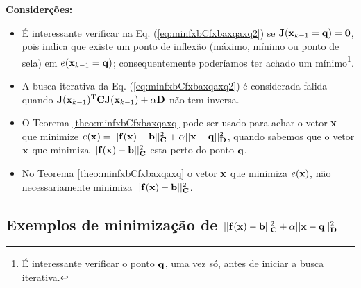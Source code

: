 \begin{theorem}
\textbf{Considerções:}

\begin{itemize}
\item É interessante verificar na Eq. (\ref{eq:minfxbCfxbaxqaxq2}) 
se  $\MATRIX{J}(\VECTOR{x}_{k-1}=\VECTOR{q}) = \MATRIX{0}$,
pois indica que existe um ponto de inflexão 
(máximo, mínimo ou ponto de sela) em $e(\VECTOR{x}_{k-1}=\VECTOR{q})$;
consequentemente poderíamos ter achado um mínimo\footnote{\label{foot:labq}É 
interessante verificar o ponto $\VECTOR{q}$, uma vez só, 
antes de iniciar a busca iterativa.}.
\item A busca iterativa da Eq. (\ref{eq:minfxbCfxbaxqaxq2}) é considerada falida quando 
$\MATRIX{J}(\VECTOR{x}_{k-1})^{\transpose}\MATRIX{C} \MATRIX{J}(\VECTOR{x}_{k-1}) +\alpha\MATRIX{D}$
não tem inversa.
\end{itemize}

\end{theorem} 

\begin{tcbattention}
\begin{itemize}
\item O Teorema \ref{theo:minfxbCfxbaxqaxq} pode ser usado para achar o vetor $\VECTOR{x}$
que minimize $e(\VECTOR{x})=||\VECTOR{f}(\VECTOR{x})-\VECTOR{b}||_{\MATRIX{C}}^2+\alpha||\VECTOR{x}-\VECTOR{q}||_{\MATRIX{D}}^2$,
quando sabemos que o vetor $\VECTOR{x}$ que minimiza $||\VECTOR{f}(\VECTOR{x})-\VECTOR{b}||_{\MATRIX{C}}^2$ 
esta perto do ponto $\VECTOR{q}$.
\item No Teorema \ref{theo:minfxbCfxbaxqaxq} o vetor $\VECTOR{x}$ que minimiza $e(\VECTOR{x})$, 
não necessariamente minimiza  $||\VECTOR{f}(\VECTOR{x})-\VECTOR{b}||_{\MATRIX{C}}^2$.
\end{itemize}
\end{tcbattention}

\subsection{Exemplos de minimização de 
$||\VECTOR{f}(\VECTOR{x})-\VECTOR{b}||_{\MATRIX{C}}^2+\alpha||\VECTOR{x}-\VECTOR{q}||_{\MATRIX{D}}^2$}


